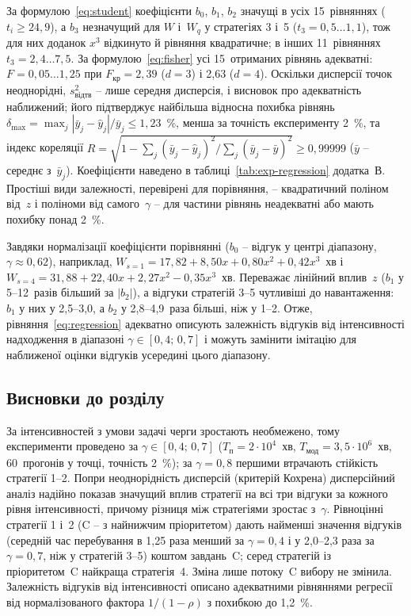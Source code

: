 За формулою~\eqref{eq:student} коефіцієнти $b_0$, $b_1$, $b_2$ значущі в усіх 15~рівняннях
($t_i \ge 24{,}9$), а $b_3$ незначущий для $W$ і~$W_q$ у стратегіях 3 і~5 ($t_3 = 0{,}5\ldots1{,}1$),
тож для них доданок $x^3$ відкинуто й рівняння квадратичне; в інших 11~рівняннях
$t_3 = 2{,}4\ldots7{,}5$. За формулою~\eqref{eq:fisher} усі 15~отриманих рівнянь адекватні:
$F = 0{,}05\ldots1{,}25$ при $F_{\text{кр}} = 2{,}39$ ($d = 3$) і 2,63 ($d = 4$). Оскільки дисперсії точок неоднорідні, $s^2_{\text{відтв}}$ -- лише середня дисперсія, і висновок
про адекватність наближений; його підтверджує найбільша відносна похибка рівнянь
$\delta_{\max} = \max_j |\bar y_j - \hat y_j|/\bar y_j \le 1{,}23$~\%, менша за точність
експерименту 2~\%, та індекс кореляції
$R = \sqrt{1 - \sum_j (\bar y_j - \hat y_j)^2 / \sum_j (\bar y_j - \bar y)^2} \ge 0{,}99999$ ($\bar y$ -- середнє
з~$\bar y_j$). Коефіцієнти наведено в таблиці~\ref{tab:exp-regression} додатка~В. Простіші
види залежності, перевірені для порівняння, -- квадратичний поліном від~$z$ і поліноми від
самого~$\gamma$ -- для частини рівнянь неадекватні або мають похибку понад 2~\%.

Завдяки нормалізації коефіцієнти порівнянні ($b_0$ -- відгук у центрі діапазону,
$\gamma \approx 0{,}62$), наприклад, $W_{s=1} = 17{,}82 + 8{,}50x + 0{,}80x^2 + 0{,}42x^3$~хв і
$W_{s=4} = 31{,}88 + 22{,}40x + 2{,}27x^2 - 0{,}35x^3$~хв.
Переважає лінійний вплив~$z$ ($b_1$ у 5--12~разів більший за $|b_2|$), а відгуки стратегій
3--5 чутливіші до навантаження: $b_1$ у них у 2,5--3,0, а $b_2$ у 2,8--4,9~раза більші, ніж у 1--2.
Отже, рівняння~\eqref{eq:regression} адекватно описують залежність відгуків від інтенсивності
надходження в діапазоні $\gamma \in [0{,}4;\,0{,}7]$ і можуть замінити імітацію для наближеної
оцінки відгуків усередині цього діапазону.

\subsection{Висновки до розділу}

За інтенсивностей з умови задачі черги зростають необмежено, тому експерименти проведено за
$\gamma \in [0{,}4;\,0{,}7]$ ($T_{\text{п}} = 2\cdot10^4$~хв, $T_{\text{мод}} = 3{,}5\cdot10^6$~хв,
60~прогонів у точці, точність 2~\%); за $\gamma = 0{,}8$ першими втрачають стійкість стратегії 1--2.
Попри неоднорідність дисперсій (критерій Кохрена) дисперсійний аналіз надійно показав значущий
вплив стратегії на всі три відгуки за кожного рівня інтенсивності, причому різниця між
стратегіями зростає з~$\gamma$. Рівноцінні стратегії 1 і~2
(C -- з найнижчим пріоритетом) дають найменші значення відгуків (середній час перебування в
1,25 раза менший за $\gamma = 0{,}4$ і у 2,0--2,3 раза за $\gamma = 0{,}7$, ніж у стратегій 3--5)
коштом завдань~C; серед стратегій із пріоритетом~C найкраща стратегія~4. Зміна лише потоку~C
вибору не змінила. Залежність відгуків від інтенсивності описано адекватними рівняннями регресії
від нормалізованого фактора $1/(1-\rho)$ з похибкою до 1,2~\%.
